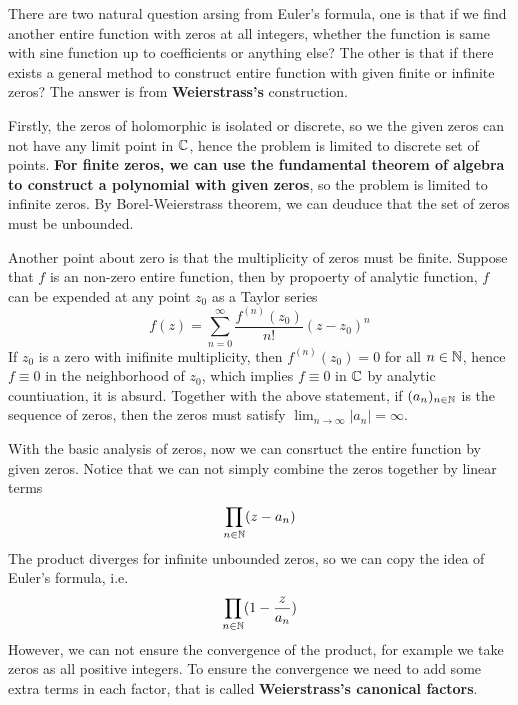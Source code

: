 \documentclass[12pt,a4paper]{article}
\begin{document}
There are two natural question arsing from Euler's formula, one is that if we find another entire function with zeros at all integers, whether the function is same with sine function up to coefficients or anything else? The other is that if there exists a general method to construct entire function with given finite or infinite zeros? The answer is from \textbf{Weierstrass's} construction.

Firstly, the zeros of holomorphic is isolated or discrete, so we the given zeros can not have any limit point in \(\mathbb{C}\), hence the problem is limited to discrete set of points. \textbf{For finite zeros, we can use the fundamental theorem of algebra to construct a polynomial with given zeros}, so the problem is limited to infinite zeros. By Borel-Weierstrass theorem, we can deuduce that the set of zeros must be unbounded.

Another point about zero is that the multiplicity of zeros must be finite. Suppose that \(f\) is an non-zero entire function, then by propoerty of analytic function, \(f\) can be expended at any point \(z_0\) as a Taylor series
\[f(z) = \sum_{n=0}^{\infty} \frac{f^{(n)}(z_0)}{n!} (z - z_0)^n\]
If \(z_0 \) is a zero with inifinite multiplicity, then \(f^{(n)}(z_0) = 0\) for all \(n \in \mathbb{N}\), hence \(f \equiv 0\) in the neighborhood of \(z_0\), which implies \(f \equiv 0\) in \(\mathbb{C}\) by analytic countiuation, it is absurd. Together with the above statement, if \((a_n)_{n \in \mathbb{N}}\) is the sequence of zeros, then the zeros must satisfy \(\lim_{n \to \infty} |a_n| = \infty\).

With the basic analysis of zeros, now we can consrtuct the entire function by given zeros. Notice that we can not simply combine the zeros together by linear terms
\[\prod_{n \in \mathbb{N}} (z-a_n)\]
The product diverges for infinite unbounded zeros, so we can copy the idea of Euler's formula, i.e.
\[\prod_{n \in \mathbb{N}} (1 - \frac{z}{a_n})\]
However, we can not ensure the convergence of the product, for example we take zeros as all positive integers. To ensure the convergence we need to add some extra terms in each factor, that is called \textbf{Weierstrass's canonical factors}.
\end{document}
